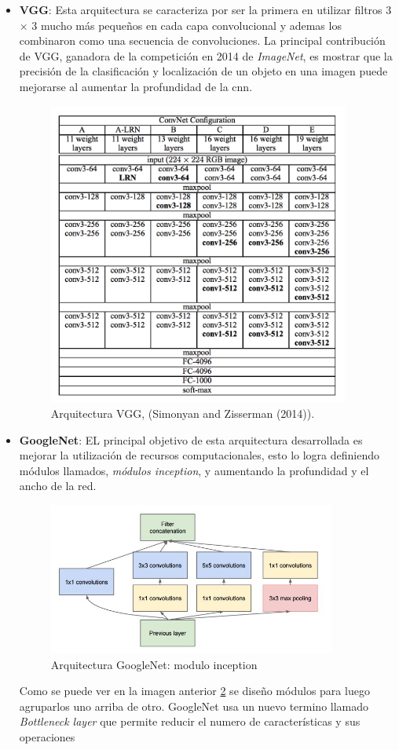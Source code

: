 \begin{itemize}
\item \textbf{VGG}: Esta arquitectura se caracteriza por ser la primera en utilizar filtros 3 × 3 mucho más pequeños en cada capa convolucional y ademas los combinaron como una secuencia de convoluciones. La principal contribución de VGG, ganadora de la competición en 2014 de \textit{ImageNet}, es mostrar que la precisión de la clasificación y localización de un objeto en una imagen puede mejorarse al aumentar la profundidad de la \ac{cnn}.

\begin{figure}[H]
 \centering
  \includegraphics[height=10cm,keepaspectratio=true,clip=true]{imagenes/MarcoTeorico/vgg.png}
  \caption{Arquitectura VGG, (Simonyan and Zisserman (2014)).}
	\label{Fig:vgg}
\end{figure}

\item \textbf{GoogleNet}: EL principal objetivo de esta arquitectura desarrollada es mejorar la utilización de recursos computacionales, esto lo logra definiendo módulos llamados, \textit{módulos inception}, y aumentando la profundidad y el ancho de la red. 
\begin{figure}[H]
 \centering
  \includegraphics[height=5cm,keepaspectratio=true,clip=true]{imagenes/MarcoTeorico/inception-1.jpg}
  \caption{Arquitectura GoogleNet: modulo inception}
	\label{Fig:inception}
\end{figure}
Como se puede ver en la imagen anterior \ref{Fig:inception} se diseño módulos para luego agruparlos uno arriba de otro. GoogleNet usa un nuevo termino llamado \textit{Bottleneck layer} que permite reducir el numero de características y sus operaciones 


\end{itemize}
